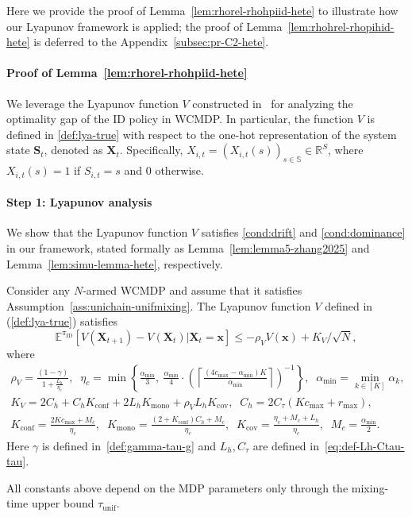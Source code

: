 \documentclass[mnsc,nonblindrev]{informs3}
\newcommand{\piid}{\pi_{\mathrm{ID}}}
\newcommand{\tmix}{\tau_{\mathrm{unif}}}
\newcommand{\bmx}{\bm{x}}
\begin{document}
Here we provide the proof of Lemma~\ref{lem:rhorel-rhohpiid-hete} to illustrate how our Lyapunov framework is applied; the proof of Lemma~\ref{lem:rhohrel-rhopihid-hete} is deferred to the Appendix~\ref{subsec:pr-C2-hete}.
\paragraph{Proof of Lemma~\ref{lem:rhorel-rhohpiid-hete}}

We leverage the Lyapunov function $V$ constructed in~\citet{zhang2025projection} for analyzing the optimality gap of the ID policy in WCMDP. {In particular, the function $V$ is defined in \eqref{def:lya-true} with respect to the one-hot representation of the system state $\bm{S}_t$, denoted as $\bm{X}_t.$ Specifically, \(X_{i,t} = (X_{i,t}(s))_{s\in\mathbb{S}} \in \mathbb{R}^{S}\), 
where \(X_{i,t}(s)=1\) if \(S_{i,t}=s\) and \(0\) otherwise.} 

\paragraph{Step 1: Lyapunov analysis} 
We show that the Lyapunov function $V$ satisfies \ref{cond:drift} and \ref{cond:dominance} in our framework, stated formally as Lemma~\ref{lem:lemma5-zhang2025} and Lemma~\ref{lem:simu-lemma-hete}, respectively. 

\begin{lemma}\label{lem:lemma5-zhang2025}
    Consider any $N$-armed WCMDP and assume that it satisfies Assumption~\ref{ass:unichain-unifmixing}. The Lyapunov function $V$ defined in (\ref{def:lya-true}) satisfies
\begin{equation}\label{drift_cond_heterogenous}
    \mathbb{E}^{\piid}[V(\bm{X}_{t+1})-V(\bm{X}_t)|\bm{X}_t=\bmx]\le -\rho_VV(\bmx)+K_V/\sqrt{N},
\end{equation}
where 
\begin{equation}\label{eq:cons-hetero-drift}
    \begin{gathered}
        \rho_V = \frac{(1 - \gamma)}{1 + \frac{L_h}{\eta_c}}, \;\;
        \eta_c = \min \left\{ \frac{\alpha_{\min}}{3},\ 
\frac{\alpha_{\min}}{4} \cdot \left( \left\lceil \frac{(4c_{\max} - \alpha_{\min})K}{\alpha_{\min}} \right\rceil \right)^{-1} \right\}, \;\;
\alpha_{\min}=\min_{k\in[K]}\alpha_k, \\
K_V = 2C_h + C_h K_{\mathrm{conf}} + 2L_h K_{\mathrm{mono}} + \rho_V L_h K_{\mathrm{cov}}, \;\;
C_h=2C_\tau(Kc_{\max}+r_{\max}),\\
K_{\mathrm{conf}}=\frac{2Kc_{\max}+M_c}{\eta_c}, \;\;
K_{\mathrm{mono}}=\frac{(2+K_{\mathrm{conf}})C_h+M_c}{\eta_c}, \;\;
K_{\mathrm{cov}}=\frac{\eta_c+M_c+L_h}{\eta_c}, \;\;
M_c = \frac{\alpha_{\min}}{2}.
    \end{gathered}
\end{equation}
Here $\gamma$ is defined in~\eqref{def:gamma-tau-g} and $L_h, C_\tau$ are defined in~\eqref{eq:def-Lh-Ctau-tau}.
\end{lemma}
All constants above depend on the MDP parameters only through the mixing-time upper bound $\tmix$.
\end{document}
